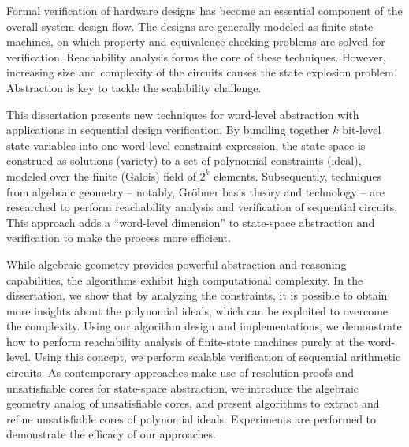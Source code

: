 Formal verification of hardware designs has become an essential
component of the overall system design flow. The designs are generally
modeled as finite state machines, on which property and equivalence
checking problems are solved for verification. Reachability analysis
forms the core of these techniques. However, increasing
size and complexity of the circuits causes the state explosion
problem. Abstraction is key to tackle the scalability challenge.

This dissertation presents new techniques for word-level abstraction
with applications in sequential design verification. By bundling
together $k$ bit-level state-variables into one word-level constraint 
expression, the state-space is construed as solutions (variety) to
a set of polynomial constraints (ideal), modeled over the finite
(Galois) field of $2^k$ elements. Subsequently, techniques from
algebraic geometry -- notably, Gr\"obner basis theory and technology
-- are researched to perform reachability analysis and
verification of sequential circuits. This approach adds a ``word-level
dimension'' to state-space abstraction and verification to make the
process more efficient.

While algebraic geometry provides powerful abstraction and reasoning
capabilities, the algorithms exhibit high computational complexity. In
the dissertation, we show that by analyzing the constraints, it is
possible to obtain more insights about the polynomial ideals, which can be
exploited to overcome the complexity. Using our algorithm design and
implementations, we demonstrate how to perform reachability
analysis of finite-state machines purely at the word-level. Using this
concept, we perform scalable verification of sequential arithmetic
circuits. As contemporary approaches make use of resolution proofs and
unsatisfiable cores for state-space abstraction, we introduce the
algebraic geometry analog of unsatisfiable cores, and present
algorithms to extract and refine unsatisfiable cores of polynomial
ideals. Experiments are performed to demonstrate the efficacy of our
approaches. 
